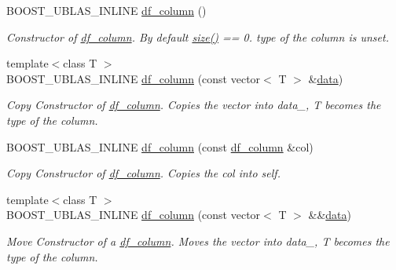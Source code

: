 \begin{DoxyCompactItemize}
\item 
B\+O\+O\+S\+T\+\_\+\+U\+B\+L\+A\+S\+\_\+\+I\+N\+L\+I\+NE \hyperlink{classboost_1_1numeric_1_1ublas_1_1df__column_aed0f5a0f8e5ebe460fd8ea54cd4c2b3f}{df\+\_\+column} ()
\begin{DoxyCompactList}\small\item\em Constructor of \hyperlink{classboost_1_1numeric_1_1ublas_1_1df__column}{df\+\_\+column}. By default {\ttfamily \hyperlink{classboost_1_1numeric_1_1ublas_1_1df__column_a595e1a88f2d9592047f77d08c438e0c2}{size()}} == 0. type of the column is unset. \end{DoxyCompactList}\item 
{\footnotesize template$<$class T $>$ }\\B\+O\+O\+S\+T\+\_\+\+U\+B\+L\+A\+S\+\_\+\+I\+N\+L\+I\+NE \hyperlink{classboost_1_1numeric_1_1ublas_1_1df__column_a802b6b7ccc4aaff5c6de0b4464955bae}{df\+\_\+column} (const vector$<$ T $>$ \&\hyperlink{classboost_1_1numeric_1_1ublas_1_1df__column_ae8691246ec130db7ac17d784de562044}{data})
\begin{DoxyCompactList}\small\item\em Copy Constructor of \hyperlink{classboost_1_1numeric_1_1ublas_1_1df__column}{df\+\_\+column}. Copies the vector into data\+\_\+, T becomes the type of the column. \end{DoxyCompactList}\item 
B\+O\+O\+S\+T\+\_\+\+U\+B\+L\+A\+S\+\_\+\+I\+N\+L\+I\+NE \hyperlink{classboost_1_1numeric_1_1ublas_1_1df__column_a8d5aa05f0defc897bd070481cd54afd4}{df\+\_\+column} (const \hyperlink{classboost_1_1numeric_1_1ublas_1_1df__column}{df\+\_\+column} \&col)
\begin{DoxyCompactList}\small\item\em Copy Constructor of \hyperlink{classboost_1_1numeric_1_1ublas_1_1df__column}{df\+\_\+column}. Copies the col into self. \end{DoxyCompactList}\item 
{\footnotesize template$<$class T $>$ }\\B\+O\+O\+S\+T\+\_\+\+U\+B\+L\+A\+S\+\_\+\+I\+N\+L\+I\+NE \hyperlink{classboost_1_1numeric_1_1ublas_1_1df__column_a2e3c5361049a075bb6010191cc3dc73b}{df\+\_\+column} (const vector$<$ T $>$ \&\&\hyperlink{classboost_1_1numeric_1_1ublas_1_1df__column_ae8691246ec130db7ac17d784de562044}{data})
\begin{DoxyCompactList}\small\item\em Move Constructor of a \hyperlink{classboost_1_1numeric_1_1ublas_1_1df__column}{df\+\_\+column}. Moves the vector into data\+\_\+, T becomes the type of the column. \end{DoxyCompactList}\item 

\end{DoxyCompactItemize}
